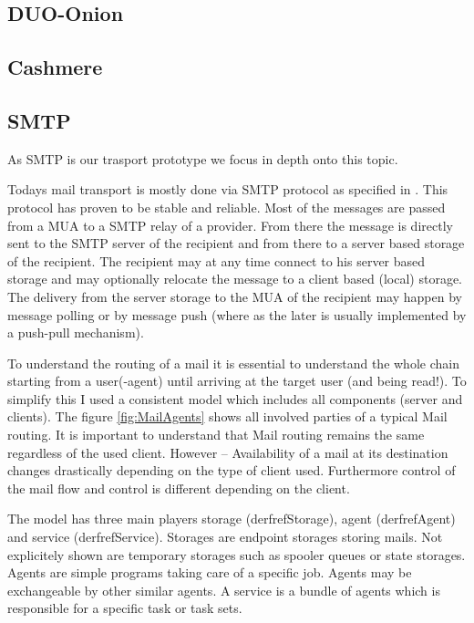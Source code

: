 \subsection{DUO-Onion}
\cite{iwanik2005duo}


\subsection{Cashmere}

\cite{zhuang2005cashmere}


\subsection{SMTP}
As SMTP is our trasport prototype we focus in depth onto this topic.

Todays mail transport is mostly done via SMTP protocol as specified in \cite{RFC5321}. This protocol has proven to be stable and reliable. Most of the messages are passed from a MUA to a SMTP relay of a provider. From there the message is directly sent to the SMTP server of the recipient and from there to a server based storage of the recipient. The recipient may at any time connect to his server based storage and may optionally relocate the message to a client based (local) storage. The delivery from the server storage to the MUA of the recipient may happen by message polling or by message push (where as the later is usually implemented by a push-pull mechanism).\par

To understand the routing of a mail it is essential to understand the whole chain starting from a user(-agent) until arriving at the target user (and being read!). To simplify this I used a consistent model which includes all components (server and clients). The figure \ref{fig:MailAgents} shows all involved parties of a typical Mail routing. It is important to understand that Mail routing remains the same regardless of the used client. However -- Availability of a mail at its destination changes drastically depending on the type of client used. Furthermore control of the mail flow and control is different depending on the client.\par

The model has three main players storage (derfref{Storage}), agent (derfref{Agent}) and service (derfref{Service}). Storages are endpoint storages storing mails. Not explicitely shown are temporary storages such as spooler queues or state storages. Agents are simple programs taking care of a specific job. Agents may be exchangeable by other similar agents. A service is a bundle of agents which is responsible for a specific task or task sets.

